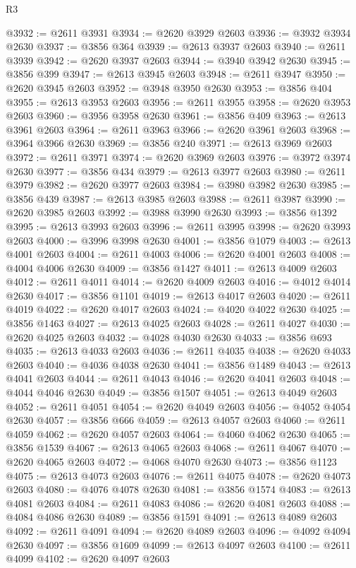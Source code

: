\begin{lexlean}{R3}
\begin{coremodule}
@3932 := @2611 @3931
@3934 := @2620 @3929 @2603
@3936 := @3932 @3934 @2630
@3937 := @3856 @364
@3939 := @2613 @3937 @2603
@3940 := @2611 @3939
@3942 := @2620 @3937 @2603
@3944 := @3940 @3942 @2630
@3945 := @3856 @399
@3947 := @2613 @3945 @2603
@3948 := @2611 @3947
@3950 := @2620 @3945 @2603
@3952 := @3948 @3950 @2630
@3953 := @3856 @404
@3955 := @2613 @3953 @2603
@3956 := @2611 @3955
@3958 := @2620 @3953 @2603
@3960 := @3956 @3958 @2630
@3961 := @3856 @409
@3963 := @2613 @3961 @2603
@3964 := @2611 @3963
@3966 := @2620 @3961 @2603
@3968 := @3964 @3966 @2630
@3969 := @3856 @240
@3971 := @2613 @3969 @2603
@3972 := @2611 @3971
@3974 := @2620 @3969 @2603
@3976 := @3972 @3974 @2630
@3977 := @3856 @434
@3979 := @2613 @3977 @2603
@3980 := @2611 @3979
@3982 := @2620 @3977 @2603
@3984 := @3980 @3982 @2630
@3985 := @3856 @439
@3987 := @2613 @3985 @2603
@3988 := @2611 @3987
@3990 := @2620 @3985 @2603
@3992 := @3988 @3990 @2630
@3993 := @3856 @1392
@3995 := @2613 @3993 @2603
@3996 := @2611 @3995
@3998 := @2620 @3993 @2603
@4000 := @3996 @3998 @2630
@4001 := @3856 @1079
@4003 := @2613 @4001 @2603
@4004 := @2611 @4003
@4006 := @2620 @4001 @2603
@4008 := @4004 @4006 @2630
@4009 := @3856 @1427
@4011 := @2613 @4009 @2603
@4012 := @2611 @4011
@4014 := @2620 @4009 @2603
@4016 := @4012 @4014 @2630
@4017 := @3856 @1101
@4019 := @2613 @4017 @2603
@4020 := @2611 @4019
@4022 := @2620 @4017 @2603
@4024 := @4020 @4022 @2630
@4025 := @3856 @1463
@4027 := @2613 @4025 @2603
@4028 := @2611 @4027
@4030 := @2620 @4025 @2603
@4032 := @4028 @4030 @2630
@4033 := @3856 @693
@4035 := @2613 @4033 @2603
@4036 := @2611 @4035
@4038 := @2620 @4033 @2603
@4040 := @4036 @4038 @2630
@4041 := @3856 @1489
@4043 := @2613 @4041 @2603
@4044 := @2611 @4043
@4046 := @2620 @4041 @2603
@4048 := @4044 @4046 @2630
@4049 := @3856 @1507
@4051 := @2613 @4049 @2603
@4052 := @2611 @4051
@4054 := @2620 @4049 @2603
@4056 := @4052 @4054 @2630
@4057 := @3856 @666
@4059 := @2613 @4057 @2603
@4060 := @2611 @4059
@4062 := @2620 @4057 @2603
@4064 := @4060 @4062 @2630
@4065 := @3856 @1539
@4067 := @2613 @4065 @2603
@4068 := @2611 @4067
@4070 := @2620 @4065 @2603
@4072 := @4068 @4070 @2630
@4073 := @3856 @1123
@4075 := @2613 @4073 @2603
@4076 := @2611 @4075
@4078 := @2620 @4073 @2603
@4080 := @4076 @4078 @2630
@4081 := @3856 @1574
@4083 := @2613 @4081 @2603
@4084 := @2611 @4083
@4086 := @2620 @4081 @2603
@4088 := @4084 @4086 @2630
@4089 := @3856 @1591
@4091 := @2613 @4089 @2603
@4092 := @2611 @4091
@4094 := @2620 @4089 @2603
@4096 := @4092 @4094 @2630
@4097 := @3856 @1609
@4099 := @2613 @4097 @2603
@4100 := @2611 @4099
@4102 := @2620 @4097 @2603

\end{coremodule}
\end{lexlean}
